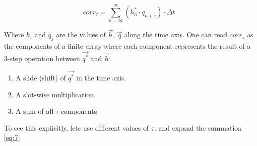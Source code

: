\vspace{0.5cm}

\begin{equation}\label{eq:7}
corr_{\tau} = \sum_{n=\infty}^{\infty} (h^*_{n} \cdot q_{n+\tau}) \cdot \Delta t
\end{equation}


Where $h_i$ and $q_j$  are the values of $\vec{h}$, $\vec{q}$ along the time axis. One can read $corr_\tau$ as the components of a finite array where each component represents  the result of a 3-step operation between $\vec{q^*}$ and $\vec{h}$:

\begin{enumerate}
\item A slide (shift) of $\vec{q^*}$ in the time axis.
\item A slot-wise multiplication.
\item A sum of all $\tau$ components
\end{enumerate}

To see this explicitly, lets use different values of $\tau$, and expand the summation \ref{eq:7} 

